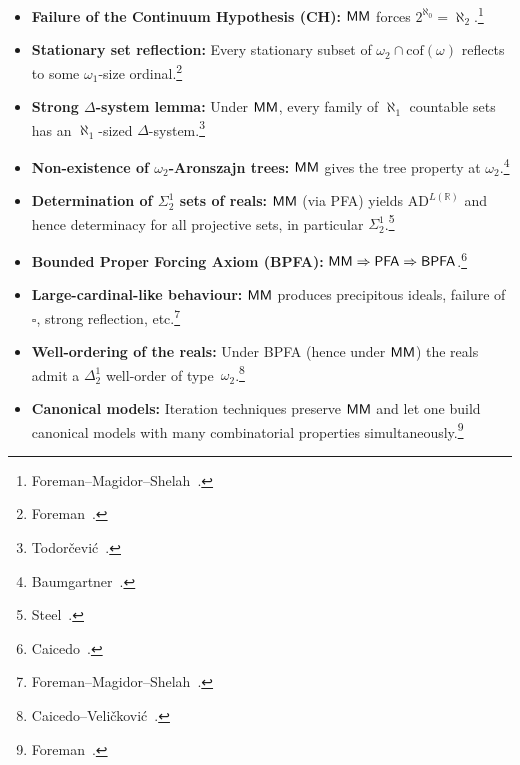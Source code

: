 \begin{itemize}
    \item \textbf{Failure of the Continuum Hypothesis (CH):}
          ${\sf MM}$ forces $2^{\aleph_0}=\aleph_2$.\footnote{Foreman--Magidor--Shelah~\cite{FMS88}.}
  
    \item \textbf{Stationary set reflection:}
          Every stationary subset of $\omega_2\cap\mathrm{cof}(\omega)$ reflects to some $\omega_1$-size ordinal.\footnote{Foreman~\cite{Foreman01}.}
  
    \item \textbf{Strong $\Delta$-system lemma:}
          Under ${\sf MM}$, every family of $\aleph_1$ countable sets has an $\aleph_1$-sized $\Delta$-system.\footnote{Todorčević~\cite{Todor84}.}
  
    \item \textbf{Non-existence of $\omega_2$-Aronszajn trees:}
          ${\sf MM}$ gives the tree property at $\omega_2$.\footnote{Baumgartner~\cite{Baumgartner84}.}
  
    \item \textbf{Determination of $\Sigma^{1}_{2}$ sets of reals:}
          ${\sf MM}$ (via PFA) yields $\mathrm{AD}^{L(\mathbb R)}$ and hence determinacy for all projective sets, in particular $\Sigma^{1}_{2}$.\footnote{Steel~\cite{Steel00}.}
  
    \item \textbf{Bounded Proper Forcing Axiom (BPFA):}
          ${\sf MM}\Rightarrow{\sf PFA}\Rightarrow{\sf BPFA}$.\footnote{Caicedo~\cite{Caicedo06}.}
  
    \item \textbf{Large-cardinal-like behaviour:}
          ${\sf MM}$ produces precipitous ideals, failure of $\square$, strong reflection, etc.\footnote{Foreman--Magidor--Shelah~\cite{FMS88}.}
  
    \item \textbf{Well-ordering of the reals:}
          Under BPFA (hence under ${\sf MM}$) the reals admit a $\Delta^{1}_{2}$ well-order of type~$\omega_2$.\footnote{Caicedo--Veličković~\cite{CaicedoVel04}.}
  
    \item \textbf{Canonical models:}
          Iteration techniques preserve ${\sf MM}$ and let one build canonical models with many combinatorial properties simultaneously.\footnote{Foreman~\cite{Foreman08}.}
  \end{itemize}
  

